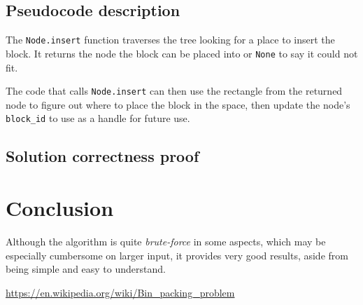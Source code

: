 \subsection{Pseudocode description}
The \texttt{Node.insert} function traverses the tree looking for a place
to insert the block.
It returns the node the block can be placed into or \texttt{None} to say
it could not fit.

The code that calls \texttt{Node.insert} can then use the rectangle
from the returned node to figure out where to place the block in the space,
then update the node's \texttt{block\_id} to use as a handle for future use.

\subsection{Solution correctness proof}

\section{Conclusion}
Although the algorithm is quite \textit{brute-force} in some aspects,
which may be especially cumbersome on larger input,
it provides very good results, aside from
being simple and easy to understand.

\newpage
\begin{thebibliography}{9}
	\url{https://en.wikipedia.org/wiki/Bin_packing_problem}
\end{thebibliography}


